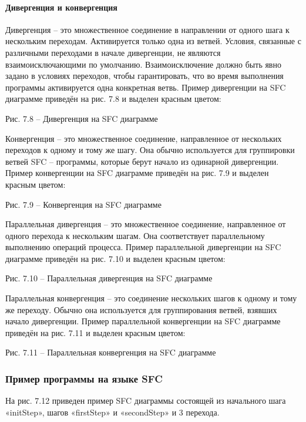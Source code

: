 \documentclass[letterpaper,10pt,russian]{sphinxmanual}
\begin{document}
\paragraph{Дивергенция и конвергенция}
\label{iec_guide/sfc_guide:id7}
Дивергенция – это множественное соединение в направлении от одного шага
к нескольким переходам. Активируется только одна из ветвей. Условия,
связанные с различными переходами в начале дивергенции, не являются
взаимоисключающими по умолчанию. Взаимоисключение должно быть явно
задано в условиях переходов, чтобы гарантировать, что во время
выполнения программы активируется одна конкретная ветвь. Пример
дивергенции на SFC диаграмме приведён на рис. 7.8 и выделен красным
цветом:


Рис. 7.8 – Дивергенция на SFC диаграмме

Конвергенция – это множественное соединение, направленное от нескольких
переходов к одному и тому же шагу. Она обычно используется для
группировки ветвей SFC – программы, которые берут начало из одинарной
дивергенции. Пример конвергенции на SFC диаграмме приведён на рис. 7.9 и
выделен красным цветом:


Рис. 7.9 – Конвергенция на SFC диаграмме

Параллельная дивергенция – это множественное соединение, направленное от
одного перехода к нескольким шагам. Она соответствует параллельному
выполнению операций процесса. Пример параллельной дивергенции на SFC
диаграмме приведён на рис. 7.10 и выделен красным цветом:


Рис. 7.10 – Параллельная дивергенция на SFC диаграмме

Параллельная конвергенция – это соединение нескольких шагов к одному и
тому же переходу. Обычно она используется для группирования ветвей,
взявших начало дивергенции. Пример параллельной конвергенции на SFC
диаграмме приведён на рис. 7.11 и выделен красным цветом:


Рис. 7.11 – Параллельная конвергенция на SFC диаграмме


\subsubsection{Пример программы на языке SFC}
\label{iec_guide/sfc_guide:id8}
На рис. 7.12 приведен пример SFC диаграммы состоящей из начального шага
«initStep», шагов «firstStep» и «secondStep» и 3 перехода.
\end{document}
